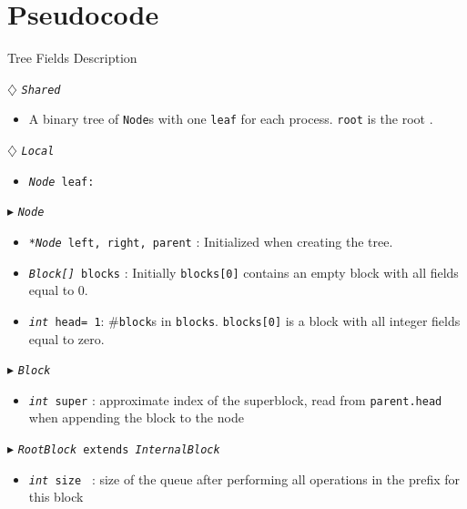 \documentclass[10pt]{article}
\renewcommand{\tt}[1]{\texttt{#1}}
\renewcommand{\sl}[1]{\textsl{#1}}
\newcommand{\nf}[1]{{\normalfont{\texttt{#1}}}}
\newcommand{\head}{head}
\newcommand{\size}{size }
\theoremstyle{definition}
\begin{document}
\section{Pseudocode}
\begin{algorithm}
\caption{Tree Fields Description}
\begin{algorithmic}[1]
\setcounter{ALG@line}{100}
\begin{multicols}{2}

\Statex $\diamondsuit$ \tt{\sl{Shared}}
\begin{itemize}
\item \textsf{A binary tree of \tt{Node}s with one \tt{leaf} for each process. \tt{root} is the root \nf{node}.}
\end{itemize}

\Statex $\diamondsuit$ \tt{\sl{Local}}
\begin{itemize}
\item \tt{\sl{Node} leaf:} 
\end{itemize}

\Statex $\blacktriangleright$ \tt{\sl{Node}}
\begin{itemize}
\item \tt{\sl{*Node} left, right, parent} \textsf{: Initialized  when creating the tree.}
\item \tt{\sl{Block[]} blocks} \textsf{: Initially \tt{blocks[0]} contains an empty block with all fields equal to 0.}
\item \tt{\sl{int} \head= 1}\textsf{: \#\tt{block}s in \tt{blocks}. \tt{blocks[0]} is a block with all integer fields equal to zero.}
\end{itemize}

\Statex $\blacktriangleright$ \tt{\sl{Block}} 

\begin{itemize}
  \item \tt{\sl{int} super}
  \textsf{: approximate index of the superblock, read from \tt{parent.head} when appending the block to the node}
\end{itemize}


\Statex $\blacktriangleright$ \tt{\sl{RootBlock} extends \sl{InternalBlock}}
\begin{itemize}
  \item \tt{\sl{int} \size}
  \textsf{: size of the queue after performing all operations in the prefix for this block}
\end{itemize}

\pagebreak


\end{multicols}
\end{algorithmic}
\end{algorithm}
\end{document}
